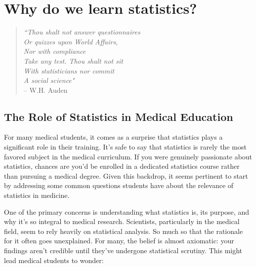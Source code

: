 


\chapter{Why do we learn statistics?~\label{ch:whystats}}


\begin{verse}{\it
``Thou shalt not answer questionnaires \\
Or quizzes upon World Affairs, \\
\hspace*{.5cm}    Nor with compliance \\
Take any test. Thou shalt not sit  \\
With statisticians nor commit \\
\hspace*{.5cm}    A social science" }\vspace*{6pt} \\ 
\hspace*{2cm} -- W.H. Auden
\end{verse}
\vspace*{12pt}


\section{The Role of Statistics in Medical Education~\label{sec:whywhywhy}}

For many medical students, it comes as a surprise that statistics plays a significant role in their training. It's safe to say that statistics is rarely the most favored subject in the medical curriculum. If you were genuinely passionate about statistics, chances are you'd be enrolled in a dedicated statistics course rather than pursuing a medical degree. Given this backdrop, it seems pertinent to start by addressing some common questions students have about the relevance of statistics in medicine.

One of the primary concerns is understanding what statistics is, its purpose, and why it's so integral to medical research. Scientists, particularly in the medical field, seem to rely heavily on statistical analysis. So much so that the rationale for it often goes unexplained. For many, the belief is almost axiomatic: your findings aren't credible until they've undergone statistical scrutiny. This might lead medical students to wonder:

